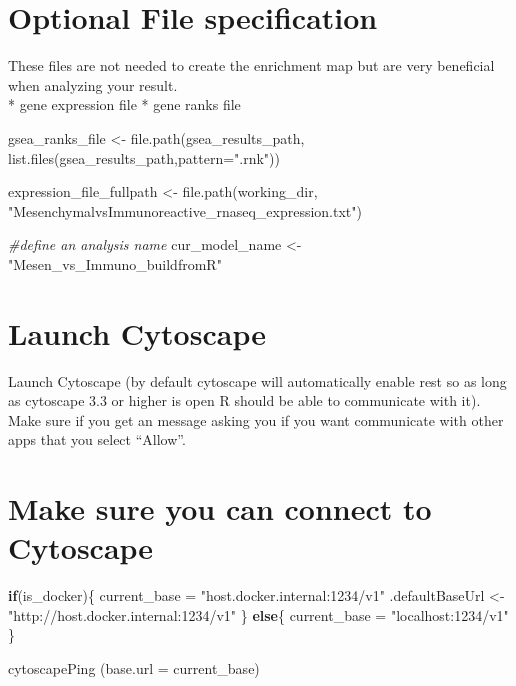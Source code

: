 \documentclass[
]{book}
\newenvironment{Shaded}{\begin{snugshade}}{\end{snugshade}}
\newcommand{\AttributeTok}[1]{\textcolor[rgb]{0.77,0.63,0.00}{#1}}
\newcommand{\CommentTok}[1]{\textcolor[rgb]{0.56,0.35,0.01}{\textit{#1}}}
\newcommand{\ControlFlowTok}[1]{\textcolor[rgb]{0.13,0.29,0.53}{\textbf{#1}}}
\newcommand{\FunctionTok}[1]{\textcolor[rgb]{0.00,0.00,0.00}{#1}}
\newcommand{\NormalTok}[1]{#1}
\newcommand{\OtherTok}[1]{\textcolor[rgb]{0.56,0.35,0.01}{#1}}
\newcommand{\StringTok}[1]{\textcolor[rgb]{0.31,0.60,0.02}{#1}}
\begin{document}
\hypertarget{optional-file-specification}{%
\section{Optional File specification}\label{optional-file-specification}}

These files are not needed to create the enrichment map but are very beneficial when analyzing your result.\\
* gene expression file
* gene ranks file

\begin{Shaded}
\begin{Highlighting}[]
\NormalTok{gsea\_ranks\_file }\OtherTok{\textless{}{-}} \FunctionTok{file.path}\NormalTok{(gsea\_results\_path,}
                             \FunctionTok{list.files}\NormalTok{(gsea\_results\_path,}\AttributeTok{pattern=}\StringTok{".rnk"}\NormalTok{))}

\NormalTok{expression\_file\_fullpath }\OtherTok{\textless{}{-}} \FunctionTok{file.path}\NormalTok{(working\_dir,}
                          \StringTok{"MesenchymalvsImmunoreactive\_rnaseq\_expression.txt"}\NormalTok{)}

\CommentTok{\#define an analysis name}
\NormalTok{cur\_model\_name }\OtherTok{\textless{}{-}} \StringTok{"Mesen\_vs\_Immuno\_buildfromR"}
\end{Highlighting}
\end{Shaded}

\hypertarget{launch-cytoscape-1}{%
\section{Launch Cytoscape}\label{launch-cytoscape-1}}

Launch Cytoscape (by default cytoscape will automatically enable rest so as long as cytoscape 3.3 or higher is open R should be able to communicate with it). Make sure if you get an message asking you if you want communicate with other apps that you select ``Allow''.

\hypertarget{make-sure-you-can-connect-to-cytoscape-1}{%
\section{Make sure you can connect to Cytoscape}\label{make-sure-you-can-connect-to-cytoscape-1}}

\begin{Shaded}
\begin{Highlighting}[]
\ControlFlowTok{if}\NormalTok{(is\_docker)\{}
\NormalTok{  current\_base }\OtherTok{=} \StringTok{"host.docker.internal:1234/v1"}
\NormalTok{  .defaultBaseUrl }\OtherTok{\textless{}{-}} \StringTok{"http://host.docker.internal:1234/v1"}
\NormalTok{\} }\ControlFlowTok{else}\NormalTok{\{}
\NormalTok{  current\_base }\OtherTok{=} \StringTok{"localhost:1234/v1"}
\NormalTok{\}}

\FunctionTok{cytoscapePing}\NormalTok{ (}\AttributeTok{base.url =}\NormalTok{ current\_base)}
\end{Highlighting}
\end{Shaded}
\end{document}
